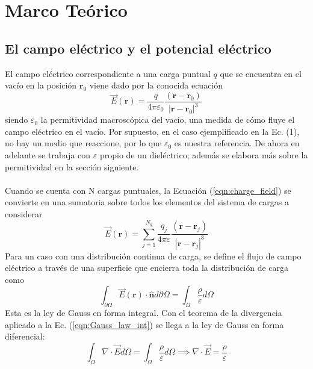 \documentclass[12pt, oneside, numbers, spanish]{ezthesis}
\numberwithin{equation}{section}
\begin{document}


\chapter{Marco Teórico}\label{Chap:Teoria}
\section{El campo eléctrico y el potencial eléctrico}\label{Sec:E_field_Pot_elec}
El campo eléctrico correspondiente a una carga puntual $q$ que se encuentra en el vacío en la posición $\mathbf{r}_0$ viene dado por la conocida ecuación
\begin{equation}\label{eqn:charge_field}
\vec{E}(\mathbf{r}) = \frac{q}{4\pi\varepsilon_0}\frac{(\mathbf{r} - \mathbf{r}_0)}{|\mathbf{r}-\mathbf{r}_0|^3}
\end{equation}
siendo $\varepsilon_0$ la permitividad macroscópica del vacío, una medida de cómo fluye el campo eléctrico en el vacío. Por supuesto, en el caso ejemplificado en la Ec. (1), no hay un medio que reaccione, por lo que $\varepsilon_0$ es nuestra referencia. De ahora en adelante se trabaja con $\varepsilon$ propio de un dieléctrico; además se elabora más sobre la permitividad en la sección siguiente.\\\\
Cuando se cuenta con N cargas puntuales, la Ecuación (\ref{eqn:charge_field}) se convierte en una sumatoria sobre todos los elementos del sistema de cargas a considerar
\begin{equation}
\vec{E}(\mathbf{r}) = \sum_{j=1}^{N_q}\frac{q_j}{4\pi\varepsilon}\frac{(\mathbf{r} - \mathbf{r}_j)}{|\mathbf{r}-\mathbf{r}_j|^3}
\end{equation}
Para un caso con una distribución continua de carga, se define el flujo de campo eléctrico a través de una superficie que encierra toda la distribución de carga como
\begin{equation}
\int_{\partial\Omega}\vec{E}(\mathbf{r})\cdot \hat{\mathbf{n}}d\partial\Omega = \int_{\Omega} \frac{\rho}{\varepsilon} d\Omega \label{eqn:Gauss_law_int}
\end{equation}
Esta es la ley de Gauss en forma integral. Con el teorema de la divergencia aplicado a la Ec. (\ref{eqn:Gauss_law_int}) se llega a la ley de Gauss en forma diferencial:
\begin{equation}
\int_{\Omega} \nabla\cdot\vec{E} d\Omega = \int_\Omega \frac{\rho}{\varepsilon}d\Omega \implies \nabla\cdot\vec{E} = \frac{\rho}{\varepsilon} \label{eqn:Gauss_law_diff}
\end{equation}
\end{document}
